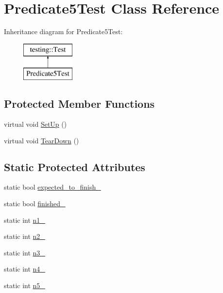 \hypertarget{class_predicate5_test}{}\section{Predicate5\+Test Class Reference}
\label{class_predicate5_test}
Inheritance diagram for Predicate5\+Test\+:\begin{figure}[H]
\begin{center}
\leavevmode
\includegraphics[height=2.000000cm]{class_predicate5_test}
\end{center}
\end{figure}
\subsection*{Protected Member Functions}
\begin{DoxyCompactItemize}
\item 
virtual void \hyperlink{class_predicate5_test_a42bf622b4f2134d0497cd42fd2e3e1df}{Set\+Up} ()
\item 
virtual void \hyperlink{class_predicate5_test_ab7bc4521d96174d5ef96156edc15444d}{Tear\+Down} ()
\end{DoxyCompactItemize}
\subsection*{Static Protected Attributes}
\begin{DoxyCompactItemize}
\item 
static bool \hyperlink{class_predicate5_test_aa502b7a330cc5c64785ff59aad3ef180}{expected\+\_\+to\+\_\+finish\+\_\+}
\item 
static bool \hyperlink{class_predicate5_test_a5003aada64accf06cdb28b1ff1797353}{finished\+\_\+}
\item 
static int \hyperlink{class_predicate5_test_a356c8e361185b234a417ed895eb14e38}{n1\+\_\+}
\item 
static int \hyperlink{class_predicate5_test_a5bf48ba65b7baf20abe1d2af90779ce0}{n2\+\_\+}
\item 
static int \hyperlink{class_predicate5_test_a63723efb915dbf418c31b97b64dabc0e}{n3\+\_\+}
\item 
static int \hyperlink{class_predicate5_test_a5d66aa58badddc8d3d8070a93c0558d6}{n4\+\_\+}
\item 
static int \hyperlink{class_predicate5_test_a96badba6366235a2771b27ea014bd9ce}{n5\+\_\+}
\end{DoxyCompactItemize}
